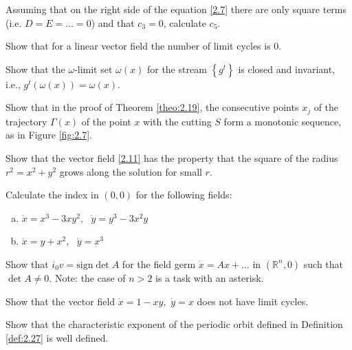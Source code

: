 \begin{task}
	Assuming that on the right side of the equation \eqref{2.7} there are only square terms (i.e. $D = E =\ldots = 0$) and that $c_3 = 0$, calculate $c_5$.
\end{task}

\begin{task}
	Show that for a linear vector field the number of limit cycles is 0.
\end{task}

\begin{task}
	Show that the $\omega$-limit set $\omega(x)$ for the stream $\left\{ g^{t}\right\} $ is closed and invariant, i.e., $g^{t}\left( \omega (x)\right) =\omega (x)$.
\end{task}

\begin{task}
	Show that in the proof of Theorem \ref{theo:2.19}, the consecutive points $x_j$ of the trajectory $\Gamma(x)$ of the point $x$ with the cutting $S$ form a monotonic sequence, as in Figure \ref{fig:2.7}.
\end{task}

\begin{task}
	Show that the vector field \eqref{2.11} has the property that the square of the radius $r^{2}=x^{2}+y^{2}$ grows along the solution for small $r$.
\end{task}

\begin{task}
	Calculate the index in $(0, 0)$ for the following fields:
	\begin{enumerate}[(a)]
		\item $\dot{x} = x^{3}-3xy^{2},\text{ \ }\dot{y}=y^{3}-3x^{2}y$
		\item $\dot{x} = y+x^{2},\text{ \ \ }\dot{y}=x^{3}$
	\end{enumerate}
\end{task}

\begin{task}
	Show that $i_{0}v=\textrm{sign}\det A$ for the field germ $\dot{x}=Ax+\ldots $ in $\left( \mathbb{R}^{n},0\right) $ such that $\det A\not=0.$ Note: the case of $n> 2$ is a task with an asterisk.
\end{task}

\begin{task}
	Show that the vector field $\dot{x}=1-xy,$ $%
	\dot{y}=x$ does not have limit cycles.
\end{task}

\begin{task}
	Show that the characteristic exponent of the periodic orbit defined in Definition \ref{def:2.27} is well defined.
\end{task}

